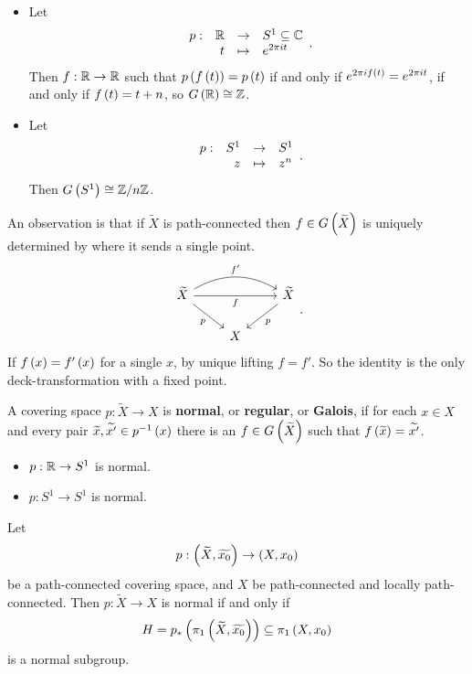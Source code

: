 \begin{example*}
\hfill
\begin{itemize}
\item Let
$$ \function[p]{\R}{S^1 \subseteq \C}{t}{e^{2\pi i t}}. $$
Then $ f : \mathbb{R} \to \mathbb{R} $ such that $ p\left( f\left( t \right) \right) = p\left( t \right) $ if and only if $ e^{2\pi if\left( t \right)} = e^{2\pi it} $, if and only if $ f\left( t \right) = t + n $, so $ G\left( \mathbb{R} \right) \cong \mathbb{Z} $.
\item Let
$$ \function[p]{S^1}{S^1}{z}{z^n}. $$
Then $ G\left( S^1 \right) \cong \mathbb{Z} / n\mathbb{Z} $.
\end{itemize}
\end{example*}

An observation is that if $ \widetilde{X} $ is path-connected then $ f \in G\left( \widetilde{X} \right) $ is uniquely determined by where it sends a single point.
$$
\begin{tikzcd}
\widetilde{X} \arrow[swap]{rr}{f} \arrow[bend left=30]{rr}{f'} \arrow[swap]{dr}{p} & & \widetilde{X} \arrow{dl}{p} \\
& X &
\end{tikzcd}.
$$
If $ f\left( x \right) = f'\left( x \right) $ for a single $ x $, by unique lifting $ f = f' $. So the identity is the only deck-transformation with a fixed point.

\begin{definition*}
A covering space $ p : \widetilde{X} \to X $ is \textbf{normal}, or \textbf{regular}, or \textbf{Galois}, if for each $ x \in X $ and every pair $ \widetilde{x}, \widetilde{x'} \in p^{-1}\left( x \right) $ there is an $ f \in G\left( \widetilde{X} \right) $ such that $ f\left( \widetilde{x} \right) = \widetilde{x'} $.
\end{definition*}

\begin{example*}
\hfill
\begin{itemize}
\item $ p : \mathbb{R} \to S^1 $ is normal.
\item $ p : S^1 \to S^1 $ is normal.
\end{itemize}
\end{example*}

\begin{proposition}
Let
$$ p : \left( \widetilde{X}, \widetilde{x_0} \right) \to \left( X, x_0 \right) $$
be a path-connected covering space, and $ X $ be path-connected and locally path-connected. Then $ p : \widetilde{X} \to X $ is normal if and only if
$$ H = p_*\left( \pi_1\left( \widetilde{X}, \widetilde{x_0} \right) \right) \subseteq \pi_1\left( X, x_0 \right) $$
is a normal subgroup.
\end{proposition}

